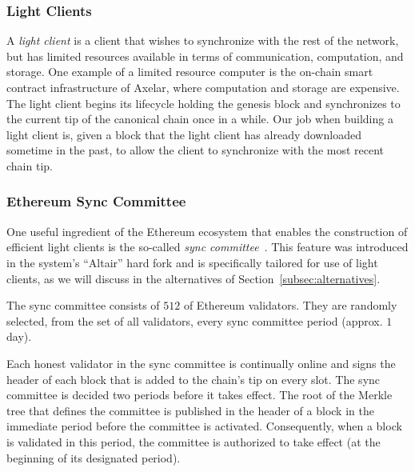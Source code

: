 \subsubsection{Light Clients}

A \emph{light client} is a client that wishes to synchronize with the rest
of the network, but has limited resources available in terms of communication,
computation, and storage. One example of a limited resource computer is the
on-chain smart contract infrastructure of Axelar, where computation and storage
are expensive. The light client begins its lifecycle holding the genesis block
and synchronizes to the current tip of the canonical chain once in a while.
Our job when building a light client is, given a block that the light client
has already downloaded sometime in the past, to allow the client to
synchronize with the most recent chain tip.



\subsubsection{Ethereum Sync Committee}\label{subsec:sync-committee}

One useful ingredient of the Ethereum ecosystem that enables the
construction of efficient light clients is the so-called \emph{sync committee}~\cite{sync-committee}.
This feature was introduced in the system's
``Altair'' hard fork and is specifically tailored for use of light clients, as
we will discuss in the alternatives of Section~\ref{subsec:alternatives}.

The sync committee consists of $512$ of Ethereum validators. They are randomly
selected, from the set of all validators, every sync committee period (approx.
$1$ day).

Each honest validator in the sync committee is continually online and signs the
header of each block that is added to the chain's tip on every slot. The sync
committee is decided two periods before it takes effect. The root of the Merkle
tree that defines the committee is published in the header of a block in the
immediate period before the committee is activated. Consequently, when a block
is validated in this period, the committee is authorized to take effect (at the
beginning of its designated period).

